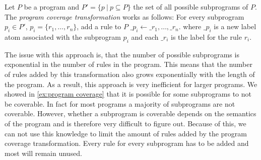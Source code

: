 \begin{definition}
\label{def:program transformation}
    Let $P$ be a program and \(P' = \{p\ |\ p \subseteq P\}\) the set of all possible subprograms of $P$. The \emph{program coverage transformation} works as follows: For every subprogram \(p_i \in P'\), \(p_i = \{r_1, \ldots, r_n\}\), add a rule to $P$ \(\_p_i \leftarrow \_r_1, \ldots, \_r_n.\) where $\_p_i$ is a new label atom associated with the subprogram $p_i$ and each $\_r_i$ is the label for the rule $r_i$.
\end{definition}

The issue with this approach is, that the number of possible subprograms is exponential in the number of rules in the program. This means that the number of rules added by this transformation also grows exponentially with the length of the program. As a result, this approach is very inefficient for larger programs. We showed in \cref{ex:program coverage} that it is possible for some subprograms to not be coverable. In fact for most programs a majority of subprograms are not coverable. However, whether a subprogram is coverable depends on the semantics of the program and is therefore very difficult to figure out. Because of this, we can not use this knowledge to limit the amount of rules added by the program coverage transformation. Every rule for every subprogram has to be added and most will remain unused.

